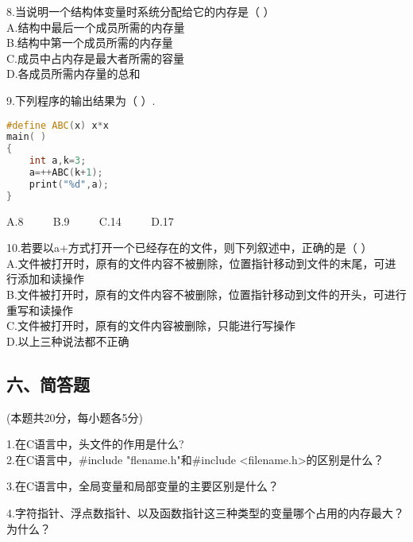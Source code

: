 8.当说明一个结构体变量时系统分配给它的内存是（    ）  \\
A.结构中最后一个成员所需的内存量 \\
B.结构中第一个成员所需的内存量 \\
C.成员中占内存是最大者所需的容量 \\
D.各成员所需内存量的总和

9.下列程序的输出结果为（    ）. \\
\begin{lstlisting}[language=cpp]
#define ABC(x) x*x
main( )
{
    int a,k=3;
    a=++ABC(k+1);
    print("%d",a);
}
\end{lstlisting}
A.8 $\qquad$ B.9 $\qquad$ C.14 $\qquad$ D.17

10.若要以a+方式打开一个已经存在的文件，则下列叙述中，正确的是（    ） \\
A.文件被打开时，原有的文件内容不被删除，位置指针移动到文件的末尾，可进行添加和读操作 \\
B.文件被打开时，原有的文件内容不被删除，位置指针移动到文件的开头，可进行重写和读操作 \\
C.文件被打开时，原有的文件内容被删除，只能进行写操作 \\
D.以上三种说法都不正确

\subsection{六、简答题}
(本题共20分，每小题各5分)

1.在C语言中，头文件的作用是什么? \\
2.在C语言中，#include "flename.h"和#include <filename.h>的区别是什么？

3.在C语言中，全局变量和局部变量的主要区别是什么？

4.字符指针、浮点数指针、以及函数指针这三种类型的变量哪个占用的内存最大？为什么？

